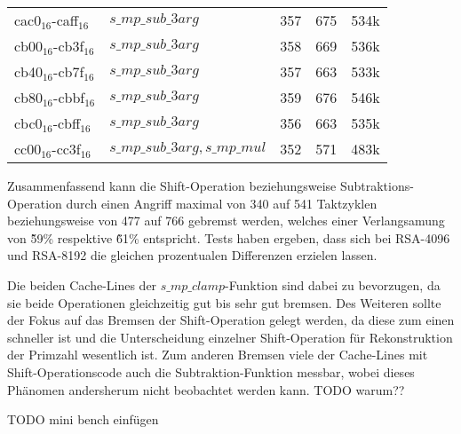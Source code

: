 \begin{table}[h]
\begin{tabular}{lllll}
cac0$_{16}$-caff$_{16}$  & $s\_mp\_sub\_3arg$             & 357   & 675         & 534k    \\
cb00$_{16}$-cb3f$_{16}$  & $s\_mp\_sub\_3arg$            & 358   & 669         & 536k    \\
cb40$_{16}$-cb7f$_{16}$  & $s\_mp\_sub\_3arg$             & 357   & 663         & 533k    \\
cb80$_{16}$-cbbf$_{16}$  & $s\_mp\_sub\_3arg$             & 359   & 676         & 546k    \\
cbc0$_{16}$-cbff$_{16}$  & $s\_mp\_sub\_3arg$             & 356   & 663         & 535k    \\
cc00$_{16}$-cc3f$_{16}$  & $s\_mp\_sub\_3arg, s\_mp\_mul$ & 352   & 571         & 483k   
\end{tabular}
\end{table}


Zusammenfassend kann die Shift-Operation beziehungsweise Subtraktions-Operation durch einen Angriff maximal von 340 auf 541 Taktzyklen beziehungsweise von 477 auf 766 gebremst werden, welches einer Verlangsamung von \~59\% respektive \~61\% entspricht.
Tests haben ergeben, dass sich bei RSA-4096 und RSA-8192 die gleichen prozentualen Differenzen erzielen lassen.

Die beiden Cache-Lines der $s\_mp\_clamp$-Funktion sind dabei zu bevorzugen, da sie beide Operationen gleichzeitig gut bis sehr gut bremsen.
Des Weiteren sollte der Fokus auf das Bremsen der Shift-Operation gelegt werden, da diese zum einen schneller ist und die Unterscheidung einzelner Shift-Operation für Rekonstruktion der Primzahl wesentlich ist.
Zum anderen Bremsen viele der Cache-Lines mit Shift-Operationscode auch die Subtraktion-Funktion messbar, wobei dieses Phänomen andersherum nicht beobachtet werden kann. 
TODO warum??

TODO mini bench einfügen




